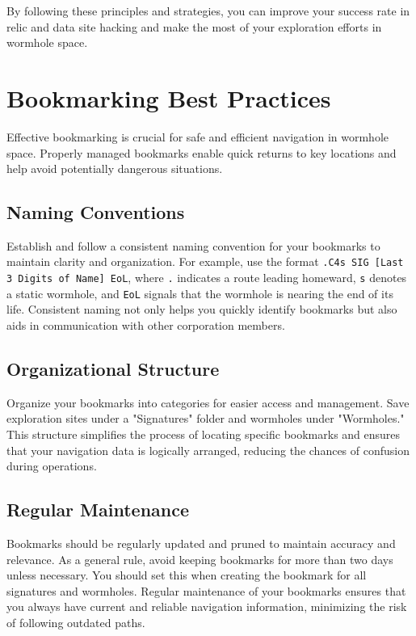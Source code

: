 \documentclass[a4paper,12pt]{report}
\begin{document}
By following these principles and strategies, you can improve your success rate in relic and data site hacking and make the most of your exploration efforts in wormhole space.

\chapter{Bookmarking Best Practices}

Effective bookmarking is crucial for safe and efficient navigation in wormhole space. Properly managed bookmarks enable quick returns to key locations and help avoid potentially dangerous situations.

\section{Naming Conventions}

Establish and follow a consistent naming convention for your bookmarks to maintain clarity and organization. For example, use the format \texttt{.C4s SIG [Last 3 Digits of Name] EoL}, where \texttt{.} indicates a route leading homeward, \texttt{s} denotes a static wormhole, and \texttt{EoL} signals that the wormhole is nearing the end of its life. Consistent naming not only helps you quickly identify bookmarks but also aids in communication with other corporation members.

\section{Organizational Structure}

Organize your bookmarks into categories for easier access and management. Save exploration sites under a "Signatures" folder and wormholes under "Wormholes." This structure simplifies the process of locating specific bookmarks and ensures that your navigation data is logically arranged, reducing the chances of confusion during operations.

\section{Regular Maintenance}

Bookmarks should be regularly updated and pruned to maintain accuracy and relevance. As a general rule, avoid keeping bookmarks for more than two days unless necessary. You should set this when creating the bookmark for all signatures and wormholes. Regular maintenance of your bookmarks ensures that you always have current and reliable navigation information, minimizing the risk of following outdated paths.
\end{document}
